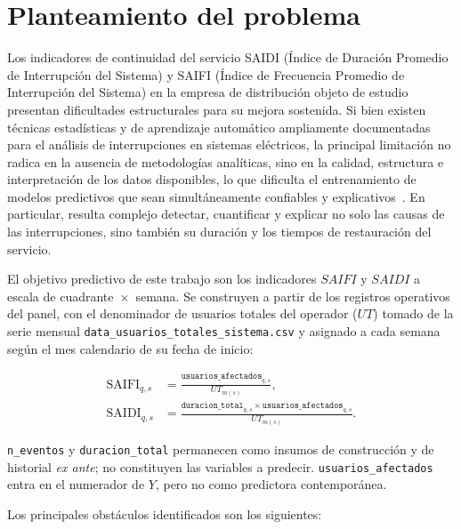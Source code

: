 \label{sec:problema}

\section{Planteamiento del problema}


Los indicadores de continuidad del servicio SAIDI (Índice de Duración Promedio de Interrupción del Sistema) y SAIFI (Índice de Frecuencia Promedio de Interrupción del Sistema) en la empresa de distribución objeto de estudio presentan dificultades estructurales para su mejora sostenida. Si bien existen técnicas estadísticas y de aprendizaje automático ampliamente documentadas para el análisis de interrupciones en sistemas eléctricos, la principal limitación no radica en la ausencia de metodologías analíticas, sino en la calidad, estructura e interpretación de los datos disponibles, lo que dificulta el entrenamiento de modelos predictivos que sean simultáneamente confiables y explicativos~\cite{ref1,ref4,ref3,ref9}. En particular, resulta complejo detectar, cuantificar y explicar no solo las causas de las interrupciones, sino también su duración y los tiempos de restauración del servicio.

El objetivo predictivo de este trabajo son los indicadores $SAIFI$ y $SAIDI$ a escala de cuadrante~$\times$~semana. Se construyen a partir de los registros operativos del panel, con el denominador de usuarios totales del operador ($UT$) tomado de la serie mensual \texttt{data\_usuarios\_totales\_sistema.csv} y asignado a cada semana según el mes calendario de su fecha de inicio:

\begin{equation}
    \begin{aligned}
    \mathrm{SAIFI}_{q,s} &= \frac{\texttt{usuarios\_afectados}_{q,s}}{UT_{m(s)}}, \\[4pt]
    \mathrm{SAIDI}_{q,s} &= \frac{\texttt{duracion\_total}_{q,s} \times \texttt{usuarios\_afectados}_{q,s}}{UT_{m(s)}}.
    \end{aligned}
    \label{eq:indicadores_operativos}
\end{equation}

\texttt{n\_eventos} y \texttt{duracion\_total} permanecen como insumos de construcción y de historial \emph{ex ante}; no constituyen las variables a predecir. \texttt{usuarios\_afectados} entra en el numerador de $Y$, pero no como predictora contemporánea.

Los principales obstáculos identificados son los siguientes:

